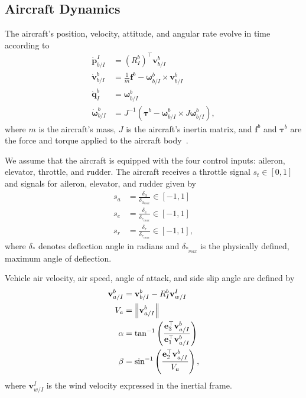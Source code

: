 \documentclass[letterpaper, 10 pt, conference]{ieeeconf}  %
\begin{document}
\begin{appendices}
	
\section{Aircraft Dynamics}
\label{sec:dynamics}

The aircraft's position, velocity, attitude, and angular rate evolve in time according to
\begin{align}
\dot{\mathbf{p}}_{b/I}^{I} & =\left(R_{I}^{b}\right)^{\top}\mathbf{v}_{b/I}^{b}\label{eq:lqr_pdot_true}\\
\dot{\mathbf{v}}_{b/I}^{b} & =\frac{1}{m}\mathbf{f}^{b}-\boldsymbol{\omega}_{b/I}^{b}\times\mathbf{v}_{b/I}^{b}\label{eq:lqr_vdot_true}\\
\dot{\mathbf{q}}_{I}^{b} & =\boldsymbol{\omega}_{b/I}^{b}\label{eq:lqr_qdot_true}\\
\dot{\boldsymbol{\omega}}_{b/I}^{b} & =J^{-1}\left(\boldsymbol{\tau}^{b}-\boldsymbol{\omega}_{b/I}^{b}\times J\boldsymbol{\omega}_{b/I}^{b}\right),\label{eq:lqr_omegadot_true}
\end{align}
where $m$ is the aircraft's mass, $J$ is the aircraft's inertia matrix, and $\mathbf{f}^b$ and $\boldsymbol{\tau}^b$ are the force and torque applied to the aircraft body~\cite{beard2012small}.

We assume that the aircraft is equipped with the four control inputs: aileron, elevator, throttle, and rudder.
The aircraft receives a throttle signal $s_t\in\left[0,1\right]$ and signals for aileron, elevator, and rudder given by
\begin{align}
s_{a} &= \frac{\delta_{a}}{\delta_{a_{max}}}\in\left[-1,1\right] \\
s_{e} &= \frac{\delta_{e}}{\delta_{e_{max}}}\in\left[-1,1\right] \\
s_{r} &= \frac{\delta_{r}}{\delta_{r_{max}}}\in\left[-1,1\right],
\end{align}
where $\delta_*$ denotes deflection angle in radians and $\delta_{*_{max}}$ is the physically defined, maximum angle of deflection.

Vehicle air velocity, air speed, angle of attack, and side slip angle are defined by
\begin{align}
\mathbf{v}_{a/I}^{b} & =\mathbf{v}_{b/I}^{b}-R_{I}^{b}\mathbf{v}_{w/I}^{I}\\
V_{a} & =\left\lVert\mathbf{v}_{a/I}^{b}\right\rVert \\
\alpha & =\tan^{-1}\left(\frac{\mathbf{e}_{3}^{\top}\mathbf{v}_{a/I}^{b}}{\mathbf{e}_{1}^{\top}\mathbf{v}_{a/I}^{b}}\right)\\
\beta & =\sin^{-1}\left(\frac{\mathbf{e}_{2}^{\top}\mathbf{v}_{a/I}^{b}}{V_{a}}\right),
\end{align}
where $\mathbf{v}_{w/I}^I$ is the wind velocity expressed in the inertial frame.


\end{appendices}
\end{document}

